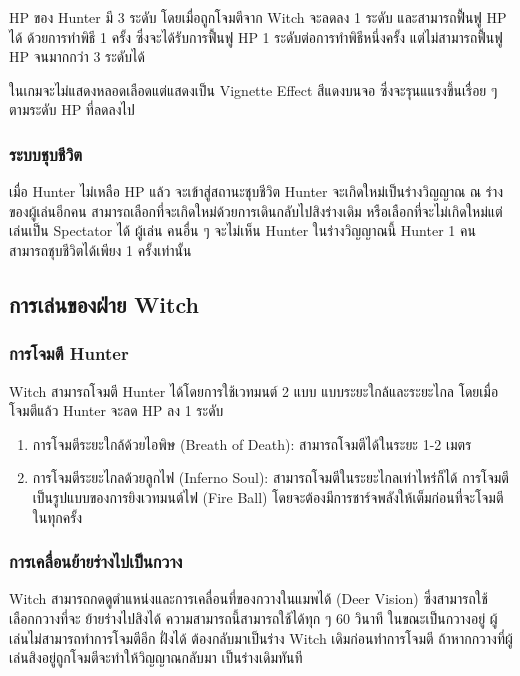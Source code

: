 HP ของ Hunter มี 3 ระดับ โดยเมื่อถูกโจมตีจาก Witch จะลดลง 1 ระดับ และสามารถฟื้นฟู HP ได้
ด้วยการทำพิธี 1 ครั้ง ซึ่งจะได้รับการฟื้นฟู HP 1 ระดับต่อการทำพิธีหนึ่งครั้ง แต่ไม่สามารถฟื้นฟู HP จนมากกว่า 3 
ระดับได้

ในเกมจะไม่แสดงหลอดเลือดแต่แสดงเป็น Vignette Effect สีแดงบนจอ ซึ่งจะรุนแแรงขึ้นเรื่อย ๆ ตามระดับ HP 
ที่ลดลงไป

\subsubsection{ระบบชุบชีวิต}

เมื่อ Hunter ไม่เหลือ HP แล้ว จะเข้าสู่สถานะชุบชีวิต Hunter จะเกิดใหม่เป็นร่างวิญญาณ ณ ร่างของผู้เล่นอีกคน 
สามารถเลือกที่จะเกิดใหม่ด้วยการเดินกลับไปสิงร่างเดิม หรือเลือกที่จะไม่เกิดใหม่แต่เล่นเป็น Spectator ได้ ผู้เล่น
คนอื่น ๆ จะไม่เห็น Hunter ในร่างวิญญาณนี้ Hunter 1 คนสามารถชุบชีวิตได้เพียง 1 ครั้งเท่านั้น

\subsection{การเล่นของฝ่าย Witch}

\subsubsection{การโจมตี Hunter}

Witch สามารถโจมตี Hunter ได้โดยการใช้เวทมนต์ 2 แบบ แบบระยะใกล้และระยะไกล โดยเมื่อโจมตีแล้ว 
Hunter จะลด HP ลง 1 ระดับ

\begin{enumerate}
  \item การโจมตีระยะใกล้ด้วยไอพิษ (Breath of Death): สามารถโจมตีได้ในระยะ 1-2 เมตร
  \item การโจมตีระยะไกลด้วยลูกไฟ (Inferno Soul): สามารถโจมตีในระยะไกลเท่าไหร่ก็ได้ การโจมตี
  เป็นรูปแบบของการยิงเวทมนต์ไฟ (Fire Ball) โดยจะต้องมีการชาร์จพลังให้เต็มก่อนที่จะโจมตีในทุกครั้ง
\end{enumerate}

\subsubsection{การเคลื่อนย้ายร่างไปเป็นกวาง}

Witch สามารถกดดูตำแหน่งและการเคลื่อนที่ของกวางในแมพได้ (Deer Vision) ซึ่งสามารถใช้เลือกกวางที่จะ
ย้ายร่างไปสิงได้ ความสามารถนี้สามารถใช้ได้ทุก ๆ 60 วินาที ในขณะเป็นกวางอยู่ ผู้เล่นไม่สามารถทำการโจมตีอีก
ฝั่งได้ ต้องกลับมาเป็นร่าง Witch เดิมก่อนทำการโจมตี ถ้าหากกวางที่ผู้เล่นสิงอยู่ถูกโจมตีจะทำให้วิญญาณกลับมา
เป็นร่างเดิมทันที

